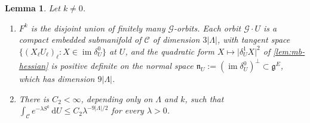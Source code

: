 \documentclass[11pt,a4paper]{amsart}
\newtheorem{lemma}[theorem]{Lemma}
\theoremstyle{definition}
\theoremstyle{remark}
\numberwithin{equation}{section}
\newcommand{\abs}[1]{\lvert #1\rvert}      %
\newcommand{\dd}{\,\mathrm{d}}             %
\begin{document}
\begin{lemma}\label{lem:mb-upper}
Let $k\ne0$.
\begin{enumerate}[label=\textup{(\roman*)},leftmargin=*]
\item $F^k$ is the disjoint union of finitely many $\mathcal G$-orbits. Each orbit $\mathcal G\cdot U$ is a compact embedded submanifold of $\mathcal C$ of dimension $3\abs\Lambda$, with tangent space $\{(X_\ell U_\ell)_\ell:X\in\operatorname{im}\delta^0_U\}$ at $U$, and the quadratic form $X\mapsto\abs{\delta^1_UX}^2$ of \cref{lem:mb-hessian} is positive definite on the normal space $\mathfrak n_U:=(\operatorname{im}\delta^0_U)^\perp\subset\mathfrak g^E$, which has dimension $9\abs\Lambda$.
\item There is $C_2<\infty$, depending only on $\Lambda$ and $k$, such that $\int_{\mathcal C}e^{-\lambda S^k}\dd U\le C_2\lambda^{-9\abs\Lambda/2}$ for every $\lambda>0$.
\end{enumerate}
\end{lemma}
\end{document}
